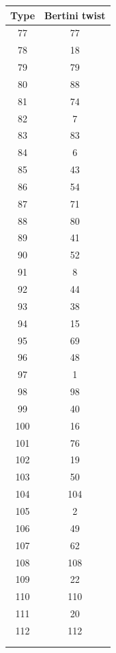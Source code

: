 \documentclass[a4paper, 11pt, reqno]{amsart}
\numberwithin{equation}{section} \numberwithin{figure}{section}
\theoremstyle{definition}
\numberwithin{lemma}{section}
\begin{document}
\begin{table}[ht]
\begin{minipage}{0.32\textwidth}
\begin{tabular}{|c|c|}
        Type & Bertini twist\\
        \hline
        77 & 77 \\
78 & 18 \\
79 & 79 \\
80 & 88 \\
81 & 74 \\
82 & 7 \\
83 & 83 \\
84 & 6 \\
85 & 43 \\
86 & 54 \\
87 & 71 \\
88 & 80 \\
89 & 41 \\
90 & 52 \\
91 & 8 \\
92 & 44 \\
93 & 38 \\
94 & 15 \\
95 & 69 \\
96 & 48 \\
97 & 1 \\
98 & 98 \\
99 & 40 \\
100 & 16 \\
101 & 76 \\
102 & 19 \\
103 & 50 \\
104 & 104 \\
105 & 2 \\
106 & 49 \\
107 & 62 \\
108 & 108 \\
109 & 22 \\
110 & 110 \\
111 & 20 \\
112 & 112 \\
 & \\
 &\\
 \hline
        \end{tabular}
    \end{minipage}
    \label{tab:bertinitwists}
\end{table}

\begin{tabular}{c|c}
     



\end{tabular}
\end{document}
